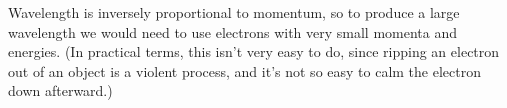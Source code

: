 Wavelength is inversely proportional to momentum, so to produce a large wavelength we would
need to use electrons with very small momenta and energies. (In practical terms, this isn't
very easy to do, since ripping an electron out of an object is a violent process, and it's
not so easy to calm the electron down afterward.)



